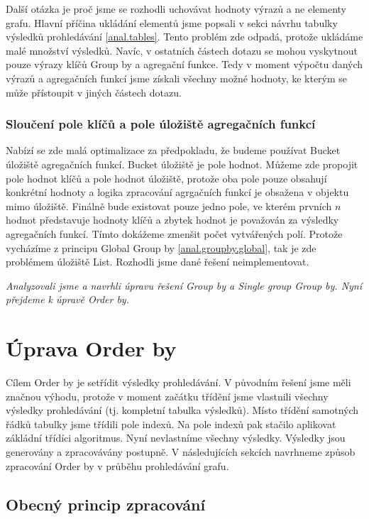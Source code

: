 Další otázka je proč jsme se rozhodli uchovávat hodnoty výrazů a ne elementy grafu.
Hlavní příčina ukládání elementů jsme popsali v sekci návrhu tabulky výsledků prohledávání \ref{anal.tables}.
Tento problém zde odpadá, protože ukládáme malé množství výsledků.
Navíc, v ostatních částech dotazu se mohou vyskytnout pouze výrazy klíčů Group by a agregační funkce.
Tedy v moment výpočtu daných výrazů a agregačních funkcí jsme získali všechny možné hodnoty, ke kterým se může přístoupit v jiných částech dotazu. 

\subsubsection{Sloučení pole klíčů a pole úložiště agregačních funkcí}

Nabízí se zde malá optimalizace za předpokladu, že budeme používat Bucket úložiště agregačních funkcí.
Bucket úložiště je pole hodnot.
Můžeme zde propojit pole hodnot klíčů a pole hodnot úložiště, protože oba pole pouze obsahují konkrétní hodnoty a logika zpracování agrgačních funkcí je obsažena v objektu mimo úložiště.
Finálně bude existovat pouze jedno pole, ve kterém prvních $n$ hodnot představuje hodnoty klíčů a zbytek hodnot je považován za výsledky agregačních funkcí.
Tímto dokážeme zmenšit počet vytvářených polí.
Protože vycházíme z principu Global Group by \ref{anal.groupby.global}, tak je zde problémem úložiště List.
Rozhodli jsme dané řešení neimplementovat.

\bigskip
\textit{Analyzovali jsme a navrhli úpravu řešení Group by a Single group Group by. 
Nyní přejdeme k úpravě Order by.}

\section{Úprava Order by} \label{anal.improvement.orderby}

Cílem Order by je setřídit výsledky prohledávání.
V původním řešení jsme měli značnou výhodu, protože v moment začátku třídění jsme vlastnili všechny výsledky prohledávání (tj. kompletní tabulka výsledků).
Místo třídění samotných řádků tabulky jsme třídili pole indexů.
Na pole indexů pak stačilo aplikovat zákládní třídíci algoritmus.
Nyní nevlastníme všechny výsledky.
Výsledky jsou generovány a zpracovávány postupně.
V následujících sekcích navrhneme způsob zpracování Order by v průběhu prohledávání grafu.

\subsection{Obecný princip zpracování}

